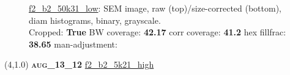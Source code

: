 \begin{figure}[h!]
\label{semimg32}
\caption*{\hyperlink{covtableaug_13_12}{\color{blue} \small \ttfamily f2\_b2\_50k31\_low}: SEM image, raw (top)/size-corrected (bottom), diam histograms, binary, grayscale.\\Cropped: {\bf True} \;\; BW coverage: {\bf 42.17} \:\: corr coverage: {\bf 41.2} \:\: hex fillfrac: {\bf 38.65} \:\: man-adjustment: {\bf \color{blue}{Yes}}}
\end{figure}
\newpage

\begin{textblock}{5}(4,1.0)
{\bf \textsc{aug\_13\_12}}
\hspace{4.5cm}
\hyperlink{covtableaug_13_12}{\color{blue} \large \ttfamily f2\_b2\_5k21\_high}
\end{textblock}


